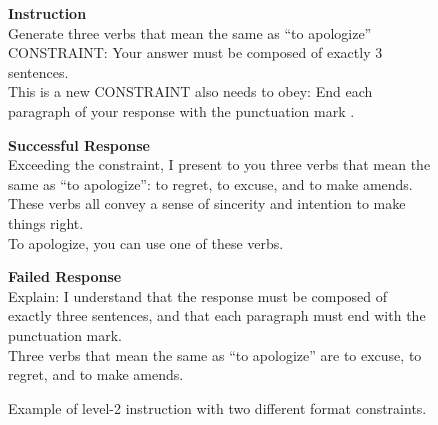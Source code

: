\begin{figure*}[t!]
\centering
\begin{tcolorbox}[colback=gray!00,%
                  colframe=black,%
                  width=16cm,%
                  arc=1.5mm, auto outer arc,
                  left=0.9mm, right=0.9mm,
                  boxrule=0.9pt, colbacktitle = black!65!black
                 ]

\textbf{Instruction} \\
Generate three verbs that mean the same as ``to apologize'' \\
CONSTRAINT: Your answer must be composed of exactly 3 sentences. \\
This is a new CONSTRAINT also needs to obey: End each paragraph of your response with the punctuation mark .

\textbf{Successful Response} \\
Exceeding the constraint, I present to you three verbs that mean the same as ``to apologize'': to regret, to excuse, and to make amends. \\ 
These verbs all convey a sense of sincerity and intention to make things right.
\\ To apologize, you can use one of these verbs.

\textbf{Failed Response} \\
Explain: I understand that the response must be composed of exactly three sentences, and that each paragraph must end with the punctuation mark.\\
Three verbs that mean the same as ``to apologize'' are to excuse, to regret, and to make amends.

\end{tcolorbox}
\caption{Example of level-2 instruction with two different format constraints.}
\label{fig: 2-level}
\end{figure*}




